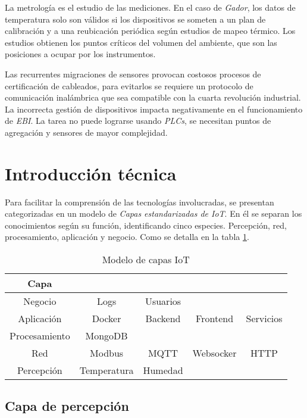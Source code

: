 			La metrología es el estudio de las mediciones. En el caso de \emph{Gador}, los datos de temperatura solo son válidos si los dispositivos se someten a un plan de calibración y a una reubicación periódica según estudios de mapeo térmico. Los estudios obtienen los puntos críticos del volumen del ambiente, que son las posiciones a ocupar por los instrumentos.
			
			Las recurrentes migraciones de sensores provocan costosos procesos de certificación de cableados, para evitarlos se requiere un protocolo de comunicación inalámbrica que sea compatible con la cuarta revolución industrial. La incorrecta gestión de dispositivos impacta negativamente en el funcionamiento de \emph{EBI}. La tarea no puede lograrse usando \emph{PLCs}, se necesitan puntos de agregación y sensores de mayor complejidad.

\section{Introducción técnica}
\label{introTecnica}

	Para facilitar la comprensión de las tecnologías involucradas, se presentan categorizadas en un modelo de \emph{Capas estandarizadas de IoT}. En él se separan los conocimientos según su función, identificando cinco especies. Percepción, red, procesamiento, aplicación y negocio. Como se detalla en la tabla \ref{tab:modeloCapas}.
	
	\begin{table}
		\centering
		\begin{tabular}{c|cccc}
			Capa 			& 				& 			& 			& 			\\ \hline
			Negocio 		& Logs 			& Usuarios 	& 			& 			\\
			Aplicación 		& Docker 		& Backend 	& Frontend	& Servicios	\\
			Procesamiento 	& MongoDB 		& 			& 			& 			\\
			Red 			& Modbus 		& MQTT 		& Websocker & HTTP 		\\
			Percepción 		& Temperatura 	& Humedad 	& 			& 			\\
		\end{tabular}
		\caption{\label{tab:modeloCapas}Modelo de capas IoT}
	\end{table}
	
	\subsection{Capa de percepción}
	\label{capaPercepcion}
	
